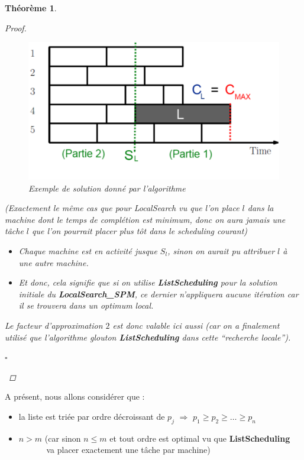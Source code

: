 \documentclass{article}
\newcommand{\cqfd}{\begin{flushright}$\square$\end{flushright}}
\newtheorem{thm}{Th\'eor\`eme}[section]
\newtheorem{proof}{Preuve}[section]
\begin{document}
\begin{sffamily}
\begin{thm}
\begin{proof}
\begin{figure}[h!]
    \begin{center}
    \includegraphics[scale=0.45]{spm4.pdf}
    \caption{Exemple de solution donné par l'algorithme}
    \end{center}
\end{figure}

\noindent (Exactement le même cas que pour LocalSearch vu que l'on place $l$ dans la
machine dont le temps de complétion est minimum, donc on aura jamais une tâche
$l$ que l'on pourrait placer plus tôt dans le scheduling courant)

\noindent \begin{itemize}
\item[$\Rightarrow$] Chaque machine est en activité jusque $S_l$, sinon on aurait pu
attribuer $l$ à une autre machine.
\item[$\Rightarrow$] Et donc, cela signifie que si on utilise \textbf{ListScheduling} pour la
solution initiale du \textbf{LocalSearch\_SPM}, ce dernier n'appliquera aucune itération car il se trouvera dans un optimum local. \\
\end{itemize}

\noindent Le facteur d'approximation $2$ est donc valable ici aussi (car on a finalement utilisé que l'algorithme glouton
\textbf{ListScheduling} dans cette ``recherche locale'').
\cqfd
\end{proof}
\end{thm}

\noindent A présent, nous allons considérer que :
\begin{itemize}
\item la liste est triée par ordre décroissant de $p_j$ $\Longrightarrow$ $p_1\geq p_2 \geq \ldots \geq p_n$
\item $n > m$ (car sinon $n\leq m$ et tout ordre est optimal vu que \textbf{ListScheduling} \\\indent $\qquad\quad$ va placer exactement
une tâche par machine) \\
\end{itemize}


\end{sffamily}
\end{document}
